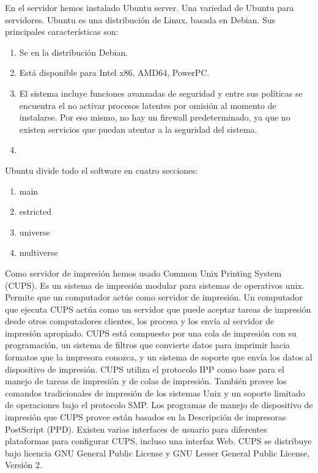En el servidor hemos instalado Ubuntu server. Una variedad de Ubuntu para servidores. Ubuntu es una distribución de Linux, basada en Debian. Sus principales características son:
\begin{enumerate}
	\item Se en la distribución Debian.
	\item Está disponible para Intel x86, AMD64, PowerPC.
	\item El sistema incluye funciones avanzadas de seguridad y entre sus políticas se encuentra el no activar procesos latentes por omisión al momento de instalarse. Por eso mismo, no hay un firewall predeterminado, ya que no existen servicios que puedan atentar a la seguridad del sistema.
	\item 
\end{enumerate}

Ubuntu divide todo el software en cuatro secciones:
\begin{enumerate}
	\item main 
	\item estricted
	\item universe
	\item multiverse
\end{enumerate}

Como servidor de impresión hemos usado Common Unix Printing System (CUPS). Es un sistema de impresión modular para sistemas de operativos unix. Permite que un computador actúe como servidor de impresión. Un computador que ejecuta CUPS actúa como un servidor que puede aceptar tareas de impresión desde otros computadores clientes, los procesa y los envía al servidor de impresión apropiado. \newline
CUPS está compuesto por una cola de impresión con su programación, un sistema de filtros que convierte datos para imprimir hacia formatos que la impresora conozca, y un sistema de soporte que envía los datos al dispositivo de impresión. CUPS utiliza el protocolo IPP como base para el manejo de tareas de impresión y de colas de impresión. También provee los comandos tradicionales de impresión de los sistemas Unix y un soporte limitado de operaciones bajo el protocolo SMP. Los programas de manejo de dispositivo de impresión que CUPS provee están basados en la Descripción de impresoras PostScript (PPD). Existen varias interfaces de usuario para diferentes plataformas para configurar CUPS, incluso una interfaz Web. CUPS se distribuye bajo licencia GNU General Public License y GNU Lesser General Public License, Versión 2.

